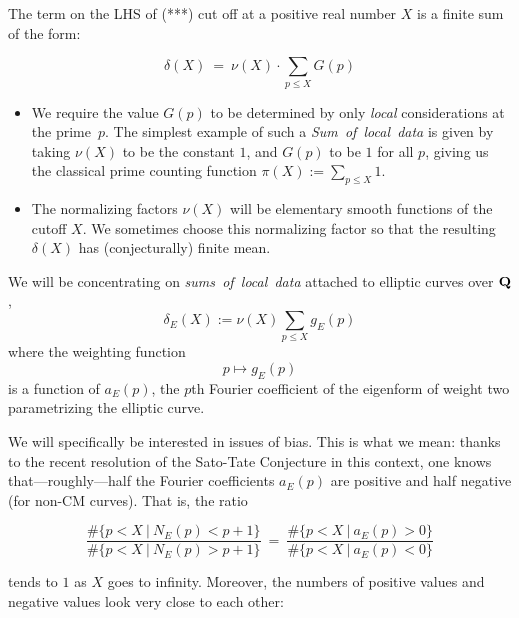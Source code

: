 \documentclass[11pt]{article}
\theoremstyle{plain}
\theoremstyle{definition}
\numberwithin{equation}{section}
\numberwithin{figure}{section}
\numberwithin{table}{section}
\def\Q{\bf{Q}}
\begin{document}
The term on the LHS of {(***)}  cut off at a positive real number $X$ is  a finite sum of the form:

  $$\delta(X) \ = \ \nu(X)\cdot \sum_{p\le X}G(p)$$



  \begin{itemize} \item We require the value $G(p)$ to be determined by only {\it local }considerations at the prime~$p$.
The simplest example of such a {\it Sum\ of\ local\ data}  is given by taking $\nu(X)$ to be the constant $1$, and  $G(p)$ to be  $1$ for all $p$, giving us the classical prime counting function $\pi(X):=\sum_{p\le X}1$. \item The normalizing factors $\nu(X)$ will be elementary smooth functions of the cutoff $X$. We sometimes choose this normalizing factor so that the  resulting  $\delta(X)$ has (conjecturally) finite mean.\end{itemize}

We will be concentrating on  {\it sums\ of\ local\ data}  attached to elliptic curves over ${\Q}$,   $$\delta_E(X):=\nu(X)\sum_{p\le X}g_E(p)$$ where the weighting function $$p \mapsto g_E(p)$$   is a function of $a_E(p)$, the $p$th Fourier coefficient of the eigenform of weight two parametrizing the elliptic curve.

  We will specifically be interested in  issues of bias. This is what we mean: thanks to the recent resolution \cite{} of the Sato-Tate Conjecture in this context, one knows that---roughly---half the Fourier coefficients  $a_E(p)$ are positive and half negative (for non-CM curves). That is,  the ratio

 $${\frac{\#\{p < X \ | \ N_E(p) < p+1 \}} {\#\{p < X \ | \ N_E(p) > p+1 \}}}\ =\ {\frac{\#\{p < X \ | \ a_E(p) > 0 \}} {\#\{p < X \ | \ a_E(p) < 0 \}}}$$

 tends to $1$ as $X$ goes to infinity. Moreover, the numbers of positive values and negative values look very close to each other:
\vskip20pt
\end{document}
